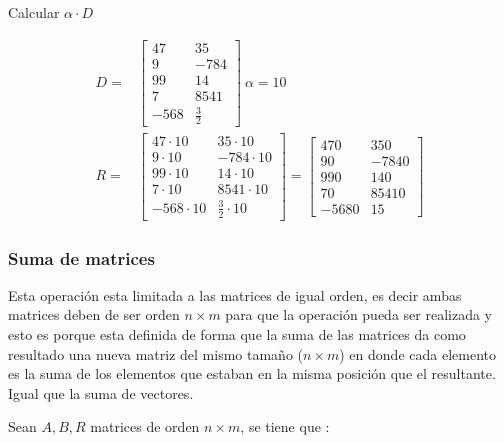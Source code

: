 Calcular $ \alpha\cdot D $

\begin{align*}
    D =
    &\begin{bmatrix}
        47 &  35\\
        9  & -784 \\
        99 & 14\\
        7 & 8541 \\
        -568 & \frac{3}{2}
    \end{bmatrix}
    \ \alpha = 10\\
    R =
    &\begin{bmatrix}
        47\cdot10 &  35\cdot10\\
        9\cdot10  & -784\cdot10 \\
        99\cdot10 & 14\cdot10\\
        7\cdot10 & 8541\cdot10 \\
        -568\cdot10 & \frac{3}{2}\cdot10
    \end{bmatrix}
    =
    \begin{bmatrix}
        470 &  350\\
        90  & -7840 \\
        990 & 140\\
        70 & 85410 \\
        -5680 & 15
    \end{bmatrix}
\end{align*}


\subsubsection{Suma de matrices} \label{Sumadematrices}

Esta operación esta limitada a las matrices de igual orden, es decir ambas
matrices deben de ser orden $n\times m$ para que la operación pueda ser realizada
y esto es porque esta definida de forma que la suma de las matrices da como
resultado una nueva matriz del mismo tamaño ($n\times m$) en donde cada elemento
es la suma de los elementos que estaban en la misma posición que el resultante.
Igual que la suma de vectores.

Sean $A,B,R$ matrices de orden $ n\times m$, se tiene que :

